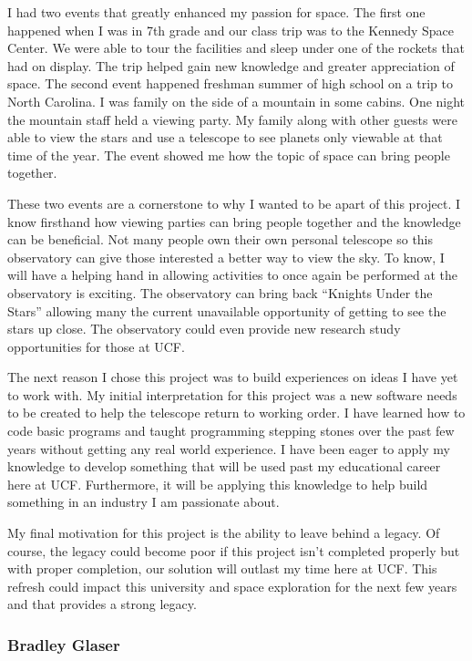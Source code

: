 \documentclass[12pt]{report}
\begin{document}
I had two events that greatly enhanced my passion for space. The first one happened when I was in 7th grade and our class trip was to the Kennedy Space Center. We were able to tour the facilities and sleep under one of the rockets that had on display. The trip helped gain new knowledge and greater appreciation of space. The second event happened freshman summer of high school on a trip to North Carolina. I was family on the side of a mountain in some cabins. One night the mountain staff held a viewing party. My family along with other guests were able to view the stars and use a telescope to see planets only viewable at that time of the year. The event showed me how the topic of space can bring people together.

These two events are a cornerstone to why I wanted to be apart of this project. I know firsthand how viewing parties can bring people together and the knowledge can be beneficial. Not many people own their own personal telescope so this observatory can give those interested a better way to view the sky. To know, I will have a helping hand in allowing activities to once again be performed at the observatory is exciting. The observatory can bring back “Knights Under the Stars” allowing many the current unavailable opportunity of getting to see the stars up close. The observatory could even provide new research study opportunities for those at UCF.

The next reason I chose this project was to build experiences on ideas I have yet to work with. My initial interpretation for this project was a new software needs to be created to help the telescope return to working order. I have learned how to code basic programs and taught programming stepping stones over the past few years without getting any real world experience. I have been eager to apply my knowledge to develop something that will be used past my educational career here at UCF. Furthermore, it will be applying this knowledge to help build something in an industry I am passionate about.

My final motivation for this project is the ability to leave behind a legacy. Of course, the legacy could become poor if this project isn’t completed properly but with proper completion, our solution will outlast my time here at UCF. This refresh could impact this university and space exploration for the next few years and that provides a strong legacy.

\subsubsection*{Bradley Glaser}
\end{document}
